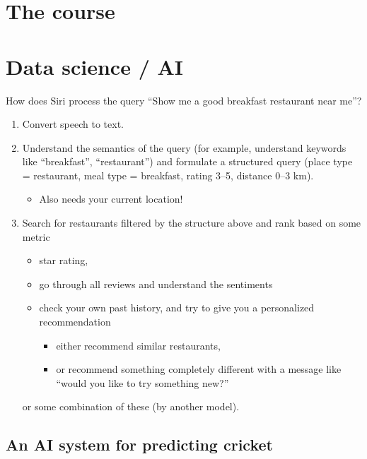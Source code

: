 \chapter*{The course} \label{chp:course}

\chapter{Data science / AI} \label{chp:aids}
How does Siri process the query
    ``Show me a good breakfast restaurant near me''?
\begin{enumerate}
    \item Convert speech to text.
    \item Understand the semantics of the query (for example,
        understand keywords like ``breakfast'', ``restaurant'') and
        formulate a structured query
        (place type = restaurant, meal type = breakfast, rating 3--5,
        distance 0--3 km).
        \begin{itemize}
            \item Also needs your current location!
        \end{itemize}
    \item Search for restaurants filtered by the structure above and rank
        based on some metric
        \begin{itemize}
            \item star rating,
            \item go through all reviews and understand the sentiments
            \item check your own past history, and try to give you a
                personalized recommendation
                \begin{itemize}
                    \item either recommend similar restaurants,
                    \item or recommend something completely different
                        with a message like ``would you like to try
                        something new?''
                \end{itemize}
        \end{itemize}
        or some combination of these (by another model).
\end{enumerate}

\section*{An AI system for predicting cricket} \label{sec:cricket}

